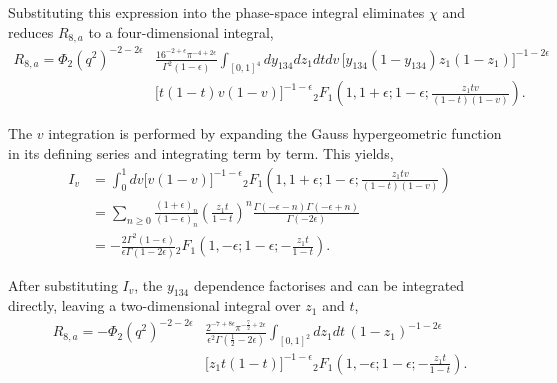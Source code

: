 Substituting this expression into the phase-space integral eliminates $\chi$ and reduces
$R_{8,a}$ to a four-dimensional integral,
\begin{equation}
    \begin{split}
        R_{8,a} = \Phi_2\!\left(q^2\right)^{-2-2\epsilon}&\frac{16^{-2+\epsilon}\pi^{-4+2\epsilon}}{\Gamma^2(1-\epsilon)}\int_{[0,1]^4}dy_{134}dz_1dtdv\,\Big[y_{134}(1-y_{134})z_1(1-z_1)\Big]^{-1-2\epsilon}\\
                                                      &\Big[t(1-t)v(1-v)\Big]^{-1-\epsilon}{}_2F_1\!\left(1,1+\epsilon;1-\epsilon;\frac{z_1tv}{(1-t)(1-v)}\right).
    \end{split}
\end{equation}

The $v$ integration is performed by expanding the Gauss hypergeometric function in its defining
series and integrating term by term. This yields,
\begin{equation}
    \begin{split}
        I_v &= \int_0^1 dv \Big[v(1-v)\Big]^{-1-\epsilon}{}_2F_1\!\left(1,1+\epsilon;1-\epsilon;\frac{z_1tv}{(1-t)(1-v)}\right)\\
            &= \sum_{n\geq0}\frac{(1+\epsilon)_n}{(1-\epsilon)_n}\!\left(\frac{z_1t}{1-t}\right)^n\frac{\Gamma(-\epsilon-n)\Gamma(-\epsilon+n)}{\Gamma(-2\epsilon)}\\
            &= -\frac{2\Gamma^2(1-\epsilon)}{\epsilon\Gamma(1-2\epsilon)}{}_2F_1\!\left(1,-\epsilon;1-\epsilon;-\frac{z_1t}{1-t}\right).
    \end{split}
\end{equation}

After substituting $I_v$, the $y_{134}$ dependence factorises and can be integrated directly,
leaving a two-dimensional integral over $z_1$ and $t$,
\begin{equation}
    \begin{split}
        R_{8,a} = -\Phi_2\!\left(q^2\right)^{-2-2\epsilon}&\frac{2^{-7+8\epsilon}\pi^{-\frac72+2\epsilon}}{\epsilon^2\Gamma\!\left(\frac12-2\epsilon\right)}\int_{[0,1]^2}dz_1dt\,(1-z_1)^{-1-2\epsilon}\\
                                                       &\Big[z_1t(1-t)\Big]^{-1-\epsilon}{}_2F_1\!\left(1,-\epsilon;1-\epsilon;-\frac{z_1t}{1-t}\right).
    \end{split}
\end{equation}

